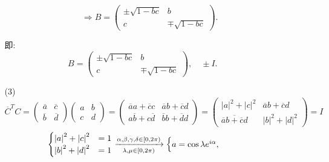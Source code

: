 \documentclass{article}
\begin{document}
\begin{enumerate}
\begin{enumerate}
\begin{enumerate}
\[                    \Rightarrow
                    B=
                    \begin{pmatrix}
                        \pm\sqrt{1-bc} & b\\
                        c & \mp\sqrt{1-bc}
                    \end{pmatrix}.
                \]
            \end{enumerate}
            即:
            \[
                B=
                \begin{pmatrix}
                    \pm\sqrt{1-bc} & b\\
                    c & \mp\sqrt{1-bc}
                \end{pmatrix},\quad
                \pm I.
            \]
            \item [(3)]
            \[
                {\overline{C}}^{T}C=
                \begin{pmatrix}
                    \overline{a} & \overline{c}\\
                    \overline{b} & \overline{d}
                \end{pmatrix}
                \begin{pmatrix}
                    a & b\\
                    c & d
                \end{pmatrix}
                =
                \begin{pmatrix}
                    \overline{a}a+\overline{c}c & \overline{a}b+\overline{c}d\\
                    a\overline{b}+c\overline{d} & \overline{b}b+\overline{d}d
                \end{pmatrix}
                =
                \begin{pmatrix}
                    {|a|}^2+{|c|}^2 & \overline{a}b+\overline{c}d\\
                    \overline{\overline{a}b+\overline{c}d} & {|b|}^2+{|d|}^2
                \end{pmatrix}
                =I
            \]
            \[
                \begin{cases}
                    {|a|}^2+{|c|}^2&=1\\
                    {|b|}^2+{|d|}^2&=1
                \end{cases}
                \xrightarrow[\lambda ,\mu \in [0,2\pi)]{\alpha ,\beta ,\gamma ,\delta \in [0,2\pi)}
                \begin{cases}
                    a=\cos\lambda  e^{i\alpha},\quad

\end{cases}\]
\end{enumerate}
\end{enumerate}
\end{document}
